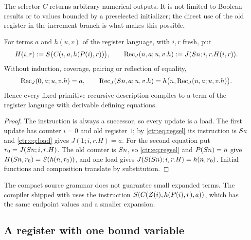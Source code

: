 The selector $C$ returns arbitrary numerical outputs. It is not limited to Boolean results or
to values bounded by a preselected initializer; the direct use of the old register in the
increment branch is what makes this possible.

\begin{theorem}\label{ctr:thm:regcompiler}
For terms $a$ and $h(u,v)$ of the register language, with $i,r$ fresh, put
\[
 H(i,r)\mathrel{:=} S\bigl(C(i,a,h(P(i),r))\bigr),\qquad
 \operatorname{Rec}_J(n,a;u,v.h)\mathrel{:=} J(S n;i,r.H(i,r)).
\]
Without induction, coverage, pairing or reflection of equality,
\[
 \operatorname{Rec}_J(0,a;u,v.h)=a,\qquad
 \operatorname{Rec}_J(S n,a;u,v.h)=h\bigl(n,\operatorname{Rec}_J(n,a;u,v.h)\bigr).
\]
Hence every fixed primitive recursive description compiles to a term of the register
language with derivable defining equations.
\end{theorem}
\begin{proof}
The instruction is always a successor, so every update is a load. The first update has
counter $i=0$ and old register $1$; by \eqref{ctr:eq:regsel} its instruction is $S a$ and
\eqref{ctr:eq:load} gives $J(1;i,r.H)=a$. For the second equation put
$r_0=J(S n;i,r.H)$. The old counter is $S n$, so \eqref{ctr:eq:regsel} and
$P(S n)=n$ give $H(S n,r_0)=S(h(n,r_0))$, and one load gives
$J(S(S n);i,r.H)=h(n,r_0)$. Initial functions and composition translate by
substitution.
\end{proof}

The compact source grammar does not guarantee small expanded terms. The compiler shipped
with  uses the instruction $S(C(Z(i),h(P(i),r),a))$, which has the
same endpoint values and a smaller expansion.

\subsection{A register with one bound variable}

